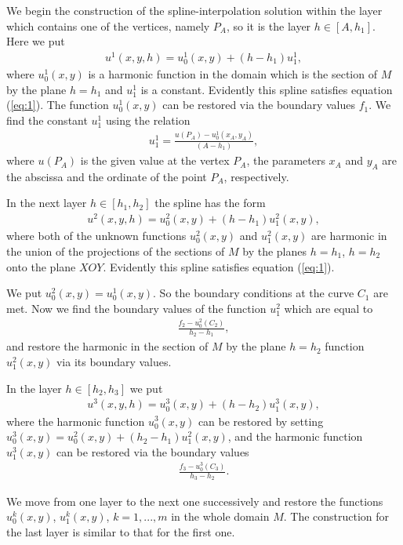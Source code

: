 \documentclass{amsart}
\begin{document}
We begin the construction of the spline-interpolation solution
within the layer which contains one of the vertices, namely $P_A$,
so it is the layer $h \in [A,h_1]$. Here we put
\begin{eqnarray}
u^1(x,y,h)=u^1_0(x,y)+(h-h_1) u^1_1,\nonumber
\end{eqnarray}
where $u^1_0(x,y)$ is a harmonic function in the domain which is the
section of $M$ by the plane $h=h_1$ and $u^1_1$ is a constant.
Evidently this spline satisfies equation (\ref{eq:1}). The function
$u^1_0(x,y)$ can be restored via the boundary values $f_1$. We find
the constant $u^1_1$ using the relation
\begin{eqnarray}
u^1_1=\frac{u(P_A)-u^1_0(x_A,y_A)}{(A-h_1)},\nonumber
\end{eqnarray}
where $u(P_A)$ is the given value at the vertex $P_A$, the
parameters $x_A$ and $y_A$ are the abscissa and the ordinate of the
point $P_A$, respectively.

In the next layer $h \in[h_1,h_2]$ the spline has the form
\begin{eqnarray}
u^2(x,y,h)=u^2_0(x,y)+(h-h_1) u^2_1(x,y),\nonumber
\end{eqnarray}
where both of the unknown functions $u^2_0(x, y)$ and $u^2_1(x, y)$
are harmonic in the union of the projections of the sections of $M$
by the planes  $h=h_1$, $h=h_2$ onto the plane $XOY$. Evidently this
spline satisfies equation (\ref{eq:1}).

We put $u^2_0(x, y) = u^1_0(x, y)$. So the boundary conditions at
the curve $C_1$ are met. Now we find the boundary values of the
function $u^2_1$ which are equal  to
\begin{eqnarray}
\frac{f_2-u^2_0(C_2)}{h_2-h_1},\nonumber
\end{eqnarray}
and restore the harmonic in the section of $M$ by the plane $h=h_2$
function $u^2_1(x,y)$ via its boundary values.

In the layer $h \in[h_2,h_3]$ we put
\begin{eqnarray}
u^3(x,y,h)=u^3_0(x,y)+(h-h_2) u^3_1(x,y),\nonumber
\end{eqnarray}
where  the harmonic function $u^3_0(x,y)$ can be restored by setting
$u^3_0(x,y)=u^2_0(x,y)+(h_2-h_1)u^2_1(x,y)$, and the harmonic
function $u^3_1(x,y)$ can be restored via the boundary values
\begin{eqnarray}
\frac{f_3-u^3_0(C_3)}{h_3-h_2}.\nonumber
\end{eqnarray}


We move from one layer to the next one successively and restore the
functions $u^k_0(x,y)$, $u^k_1(x,y)$, $k=1,...,m$ in the whole
domain $M$. The construction for the last layer is similar to that
for the first one.
\end{document}
